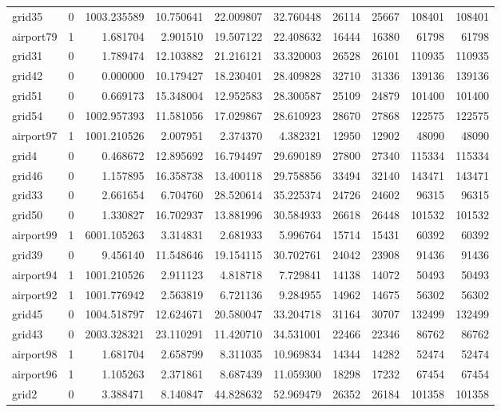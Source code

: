 \begin{longtable}{|l|r|r|r|r|r|r|r|r|r|}
grid35 & 0 & 1003.235589 & 10.750641 & 22.009807 & 32.760448 & 26114 & 25667 & 108401 & 108401 \\
airport79 & 1 & 1.681704 & 2.901510 & 19.507122 & 22.408632 & 16444 & 16380 & 61798 & 61798 \\
grid31 & 0 & 1.789474 & 12.103882 & 21.216121 & 33.320003 & 26528 & 26101 & 110935 & 110935 \\
grid42 & 0 & 0.000000 & 10.179427 & 18.230401 & 28.409828 & 32710 & 31336 & 139136 & 139136 \\
grid51 & 0 & 0.669173 & 15.348004 & 12.952583 & 28.300587 & 25109 & 24879 & 101400 & 101400 \\
grid54 & 0 & 1002.957393 & 11.581056 & 17.029867 & 28.610923 & 28670 & 27868 & 122575 & 122575 \\
airport97 & 1 & 1001.210526 & 2.007951 & 2.374370 & 4.382321 & 12950 & 12902 & 48090 & 48090 \\
grid4 & 0 & 0.468672 & 12.895692 & 16.794497 & 29.690189 & 27800 & 27340 & 115334 & 115334 \\
grid46 & 0 & 1.157895 & 16.358738 & 13.400118 & 29.758856 & 33494 & 32140 & 143471 & 143471 \\
grid33 & 0 & 2.661654 & 6.704760 & 28.520614 & 35.225374 & 24726 & 24602 & 96315 & 96315 \\
grid50 & 0 & 1.330827 & 16.702937 & 13.881996 & 30.584933 & 26618 & 26448 & 101532 & 101532 \\
airport99 & 1 & 6001.105263 & 3.314831 & 2.681933 & 5.996764 & 15714 & 15431 & 60392 & 60392 \\
grid39 & 0 & 9.456140 & 11.548646 & 19.154115 & 30.702761 & 24042 & 23908 & 91436 & 91436 \\
airport94 & 1 & 1001.210526 & 2.911123 & 4.818718 & 7.729841 & 14138 & 14072 & 50493 & 50493 \\
airport92 & 1 & 1001.776942 & 2.563819 & 6.721136 & 9.284955 & 14962 & 14675 & 56302 & 56302 \\
grid45 & 0 & 1004.518797 & 12.624671 & 20.580047 & 33.204718 & 31164 & 30707 & 132499 & 132499 \\
grid43 & 0 & 2003.328321 & 23.110291 & 11.420710 & 34.531001 & 22466 & 22346 & 86762 & 86762 \\
airport98 & 1 & 1.681704 & 2.658799 & 8.311035 & 10.969834 & 14344 & 14282 & 52474 & 52474 \\
airport96 & 1 & 1.105263 & 2.371861 & 8.687439 & 11.059300 & 18298 & 17232 & 67454 & 67454 \\
grid2 & 0 & 3.388471 & 8.140847 & 44.828632 & 52.969479 & 26352 & 26184 & 101358 & 101358 \\

\end{longtable}
